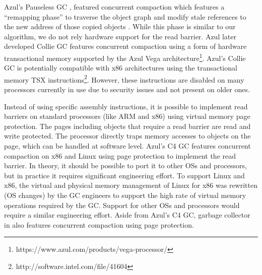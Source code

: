 \documentclass[sigplan,10pt,screen]{acmart}\settopmatter{printfolios=true,printccs=true,printacmref=true}
\newcommand{\egb}[1]{\color{blue}\fbox{\bfseries\sffamily\scriptsize Elisa:}{\sf\small$\blacktriangleright$\textit{#1}$\blacktriangleleft$}\color{black}}
\begin{document}
Azul's Pauseless GC \cite{AzulHardwareReadBarrierConcCompact}, featured concurrent compaction which features a ``remapping phase'' to traverse the object graph and modify stale references to the new address of those copied objects .
While this phase is similar to our algorithm, we do not rely hardware support for the read barrier. 
Azul later developed Collie GC \cite{AzulSTMConcCompact} features concurrent compaction using a form of hardware transactional memory supported by the Azul Vega architecture\footnote{https://www.azul.com/products/vega-processor/}. 
Azul's Collie GC is potentially compatible with x86 architectures using the transactional memory TSX instructions\footnote{http://software.intel.com/file/41604}.
However, these instructions are disabled on many processors currently in use due to security issues and not present on older ones.
 
 Instead of using specific assembly instructions, it is possible to implement read barriers on standard processors (like ARM and x86) using virtual memory page protection. The pages including objects that require a read barrier are read and write protected. The processor directly traps memory accesses to objects on the page, which can be handled at software level. 
Azul's C4 GC \cite{AzulVirtualMemConcCompact} features concurrent compaction on x86 and Linux using page protection to implement the read barrier. In theory, it should be possible to port it to other OSs and processors, but in practice it requires significant engineering effort. To support Linux and x86, the virtual and physical memory management of Linux for x86 was rewritten (OS changes) by the GC engineers to support the high rate of virtual memory operations required by the GC. Support for other OSs and processors would require a similar engineering effort.
Aside from Azul's C4 GC, garbage collector in \cite{CompressorVirtualMemConcCompact} also features concurrent compaction using page protection.

\end{document}
